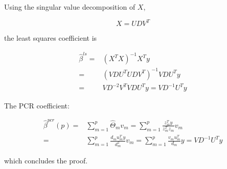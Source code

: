 \documentclass{article}
\begin{document}
Using the singular value decomposition of $X$,

\[
X = UDV^T
\]

the least squares coefficient is

\[
\begin{split}
\hat{\beta}^{ls} =& (X^TX)^{-1}X^Ty\\
=& (VDU^T UDV^T)^{-1}VDU^Ty\\
=& VD^{-2}V^T VDU^Ty=VD^{-1}U^Ty
\end{split}
\]

The PCR coefficient:

\[
\begin{split}
    \hat{\beta}^{pcr}(p) =& \sum_{m=1}^p \hat{\Theta}_m v_m = \sum_{m=1}^p \frac{z^T_m y}{z^T_m z_m} v_m\\
    =& \sum_{m=1}^p \frac{d_m u^T_m y}{d^2_m} v_m =\sum_{m=1}^p \frac{v_mu^T_m}{d_m} y = VD^{-1}U^T y
\end{split}
\]

which concludes the proof.
\end{document}
